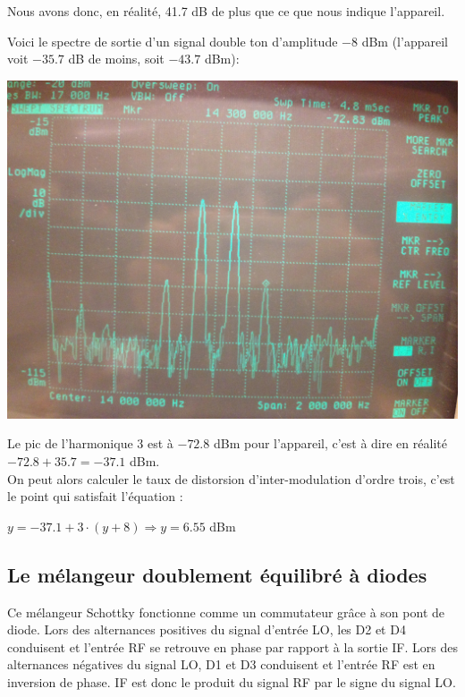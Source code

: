 \documentclass{article}
\begin{document}
Nous avons donc, en réalité, 41.7 dB de plus que ce que nous indique l'appareil.

Voici le spectre de sortie d'un signal double ton d'amplitude $-8$ dBm (l'appareil voit $-35.7$ dB de moins, soit $-43.7$ dBm):\\
\begin{center}
\includegraphics[width=0.7\linewidth]{8_3_4-8dbm.jpg}
\end{center}
Le pic de l'harmonique 3 est à $-72.8$ dBm pour l'appareil, c'est à dire en réalité $-72.8 + 35.7 = -37.1$ dBm.\\
On peut alors calculer le taux de distorsion d'inter-modulation d'ordre trois, c'est le point qui satisfait l'équation :
\begin{center}
$y = -37.1 + 3 \cdot (y+8) \Rightarrow y = 6.55$ dBm
\end{center}

%
%
%


\subsection{Le mélangeur doublement équilibré à diodes}

Ce mélangeur Schottky fonctionne comme un commutateur grâce à son pont de diode. Lors des alternances positives du signal d'entrée LO,  les D2 et D4 conduisent  et l'entrée RF se retrouve en phase  par rapport à la sortie IF. Lors des alternances négatives du signal LO, D1 et D3 conduisent et l'entrée RF est en inversion de phase. IF est donc le produit du signal RF par le signe du signal LO.
\end{document}
